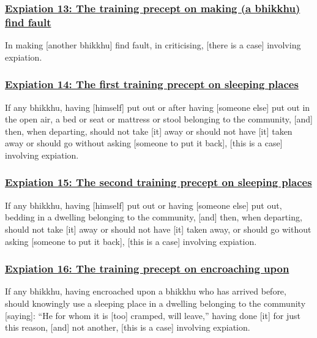 \subsubsection*{\hyperref[pac1]{Expiation 13: The training precept on making (a bhikkhu) find fault}}
\label{exp13}
In making [another bhikkhu] find fault, in criticising, [there is a case] involving expiation.



\subsubsection*{\hyperref[pac14]{Expiation 14: The first training precept on sleeping places}}
\label{exp14}
If any bhikkhu, having [himself] put out or after having [someone else] put out in the open air, a bed or seat or mattress or stool belonging to the community, [and] then, when departing, should not take [it] away or should not have [it] taken away or should go without asking [someone to put it back], [this is a case] involving expiation.



\subsubsection*{\hyperref[pac15]{Expiation 15: The second training precept on sleeping places}}
\label{exp15}
If any bhikkhu, having [himself] put out or having [someone else] put out, bedding in a dwelling belonging to the community, [and] then, when departing, should not take [it] away or should not have [it] taken away, or should go without asking [someone to put it back], [this is a case] involving expiation.



\subsubsection*{\hyperref[pac16]{Expiation 16: The training precept on encroaching upon}}
\label{exp16}
If any bhikkhu, having encroached upon a bhikkhu who has arrived before, should knowingly use a sleeping place in a dwelling belonging to the community [saying]: ``He for whom it is [too] cramped, will leave,'' having done [it] for just this reason, [and] not another, [this is a case] involving expiation.



